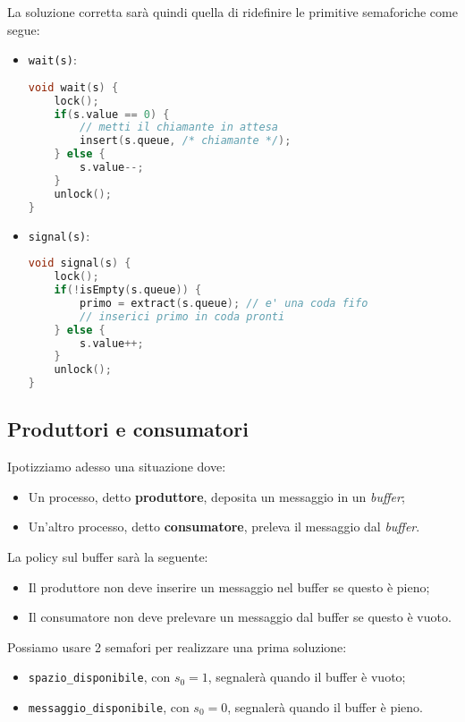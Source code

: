 \documentclass[a4paper,11pt]{article}
\begin{document}
\begin{itemize}
La soluzione corretta sarà quindi quella di ridefinire le primitive semaforiche come segue:
\begin{itemize}
	\item \lstinline|wait(s)|:
\begin{lstlisting}[language=C++, style=codestyle]	
void wait(s) {
	lock();
	if(s.value == 0) {
		// metti il chiamante in attesa
		insert(s.queue, /* chiamante */);	
	} else {
		s.value--;
	}
	unlock();
}
\end{lstlisting}
	
	\item \lstinline|signal(s)|:
\begin{lstlisting}[language=C++, style=codestyle]	
void signal(s) {
	lock();
	if(!isEmpty(s.queue)) {
		primo = extract(s.queue); // e' una coda fifo
		// inserici primo in coda pronti
	} else {
		s.value++;
	}
	unlock();
}
\end{lstlisting}
\end{itemize}

\end{itemize}

\subsection{Produttori e consumatori}
Ipotizziamo adesso una situazione dove:
\begin{itemize}
	\item Un processo, detto \textbf{produttore}, deposita un messaggio in un \textit{buffer};
	\item Un'altro processo, detto \textbf{consumatore}, preleva il messaggio dal \textit{buffer}.
\end{itemize}

La policy sul buffer sarà la seguente:
\begin{itemize}
	\item Il produttore non deve inserire un messaggio nel buffer se questo è pieno;
	\item Il consumatore non deve prelevare un messaggio dal buffer se questo è vuoto.
\end{itemize}

Possiamo usare 2 semafori per realizzare una prima soluzione:
\begin{itemize}
	\item \lstinline|spazio_disponibile|, con $s_0 = 1$, segnalerà quando il buffer è vuoto;
	\item \lstinline|messaggio_disponibile|, con $s_0 = 0$, segnalerà quando il buffer è pieno.
\end{itemize}
\end{document}
